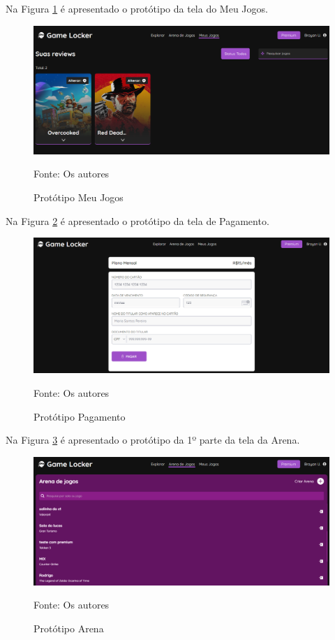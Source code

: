 \begin{apendicesenv}
Na Figura \ref{prototipoMeuJogos} é apresentado o protótipo da tela do Meu Jogos.

\begin{figure}[H]
	\centering
	\includegraphics[scale=0.45]{./imagens/PrototipoMeuJogos.png}
	\caption{Protótipo Meu Jogos}
	Fonte: Os autores
    \label{prototipoMeuJogos}
\end{figure}
\pagebreak

Na Figura \ref{prototipoPagamento} é apresentado o protótipo da tela de Pagamento.

\begin{figure}[H]
	\centering
	\includegraphics[scale=0.45]{./imagens/PrototipoPagamento.png}
	\caption{Protótipo Pagamento}
	Fonte: Os autores
    \label{prototipoPagamento}
\end{figure}
\pagebreak

Na Figura \ref{prototipoArena} é apresentado o protótipo da 1º parte da tela da Arena.

\begin{figure}[H]
	\centering
	\includegraphics[scale=0.45]{./imagens/PrototipoArena.png}
	\caption{Protótipo Arena}
	Fonte: Os autores
    \label{prototipoArena}
\end{figure}


\end{apendicesenv}
